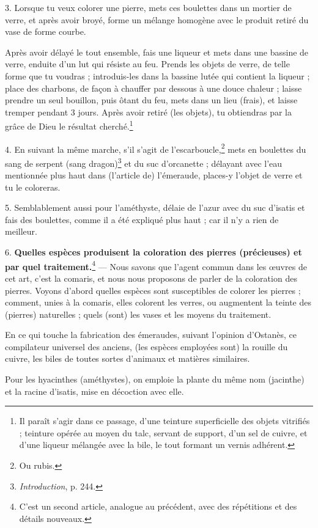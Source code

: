 \documentclass[a4paper, 11pt, oneside, polutonikogreek, french]{article}
\begin{document}
3. Lorsque tu veux colorer une pierre, mets ces boulettes dans un mortier de verre, et après avoir broyé, forme un mélange homogène avec le produit retiré du vase de forme courbe.

Après avoir délayé le tout ensemble, fais une liqueur et mets dans une bassine de verre, enduite d'un lut qui résiste au feu. Prends les objets de verre, de telle forme que tu voudras ; introduis-les dans la bassine lutée qui contient la liqueur ; place des charbons, de façon à chauffer par dessous à une douce chaleur ; laisse prendre un seul bouillon, puis ôtant du feu, mets dans un lieu (frais), et laisse tremper pendant 3 jours. Après avoir retiré (les objets), tu obtiendras par la grâce de Dieu le résultat cherché.\footnote{Il paraît s'agir dans ce passage, d'une teinture superficielle des objets vitrifiés ; teinture opérée au moyen du talc, servant de support, d'un sel de cuivre, et d'une liqueur mélangée avec la bile, le tout formant un vernis adhérent.}

4. En suivant la même marche, s'il s'agit de l'escarboucle,\footnote{Ou rubis.} mets en boulettes du sang de serpent (sang dragon)\footnote{\emph{Introduction}, p. 244.} et du suc d'orcanette ; délayant avec l'eau mentionnée plus haut dans (l'article de) l'émeraude, places-y l'objet de verre et tu le coloreras.

5. Semblablement aussi pour l'améthyste, délaie de l'azur avec du suc d'isatis et fais des boulettes, comme il a été expliqué plus haut ; car il n'y a rien de meilleur.

6. \textbf{Quelles espèces produisent la coloration des pierres (précieuses) et par quel traitement.}\footnote{C'est un second article, analogue au précédent, avec des répétitions et des détails nouveaux.} --- Nous savons que l'agent commun dans les œuvres de cet art, c'est la comaris, et nous nous proposons de parler de la coloration des pierres. Voyons d'abord quelles espèces sont susceptibles de colorer les pierres ; comment, unies à la comaris, elles colorent les verres, ou augmentent la teinte des (pierres) naturelles ; quels (sont) les vases et les moyens du traitement.

En ce qui touche la fabrication des émeraudes, suivant l'opinion d'Ostanès, ce compilateur universel des anciens, (les espèces employées sont) la rouille du cuivre, les biles de toutes sortes d'animaux et matières similaires.

Pour les hyacinthes (améthystes), on emploie la plante du même nom (jacinthe) et la racine d'isatis, mise en décoction avec elle.
\end{document}
